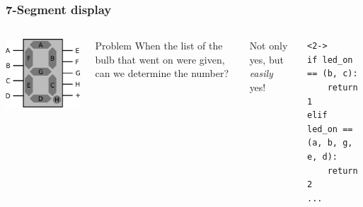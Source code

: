 \documentclass[aspectratio=169]{beamer}
\begin{document}
\begin{frame}[fragile]
	\frametitle{7-Segment display}
	\begin{columns}
		\includegraphics[width=1.0\textwidth]{imgs/7seg.png}
		\begin{block}{Problem}
			When the list of the bulb that went on were given, can we determine the number?
		\end{block}
		 Not only yes, but \textit{easily} yes!
		\begin{lstlisting}<2->
if led_on == (b, c):
    return 1
elif led_on == (a, b, g, e, d):
    return 2
...
\end{lstlisting}
	\end{columns}
\end{frame}
\end{document}
